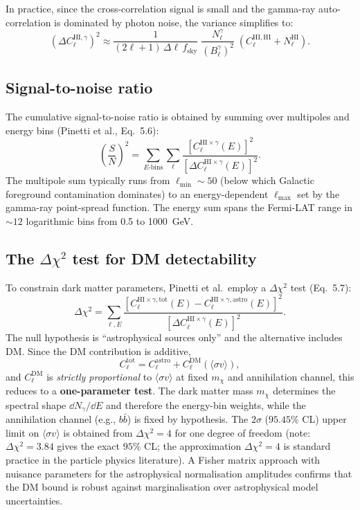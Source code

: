 \documentclass[10pt,a4paper]{article}
\newcommand{\Cl}{C_\ell}
\newcommand{\sigv}{\langle\sigma v\rangle}
\newcommand{\mchi}{m_\chi}
\newcommand{\fsky}{f_{\mathrm{sky}}}
\begin{document}
In practice, since the cross-correlation signal is small and the gamma-ray auto-correlation is dominated by photon noise, the variance simplifies to:
\begin{equation}
\label{eq:variance_approx}
\left(\Delta \Cl^{\mathrm{HI}, \gamma}\right)^2 \approx \frac{1}{(2\ell + 1) \, \Delta\ell \, \fsky} \; \frac{N_\ell^\gamma}{(B_\ell^\gamma)^2} \; \left(\Cl^{\mathrm{HI, HI}} + N_\ell^{\mathrm{HI}}\right).
\end{equation}

\subsection{Signal-to-noise ratio}

The cumulative signal-to-noise ratio is obtained by summing over multipoles and energy bins (Pinetti et al., Eq.~5.6):
\begin{equation}
\label{eq:SN}
\left(\frac{S}{N}\right)^2 = \sum_{E\text{-bins}} \sum_\ell \frac{\left[\Cl^{\mathrm{HI} \times \gamma}(E)\right]^2}{\left[\Delta \Cl^{\mathrm{HI} \times \gamma}(E)\right]^2}.
\end{equation}
The multipole sum typically runs from $\ell_{\mathrm{min}} \sim 50$ (below which Galactic foreground contamination dominates) to an energy-dependent $\ell_{\mathrm{max}}$ set by the gamma-ray point-spread function. The energy sum spans the Fermi-LAT range in $\sim 12$ logarithmic bins from 0.5 to 1000~GeV.

\subsection{The $\Delta\chi^2$ test for DM detectability}

To constrain dark matter parameters, Pinetti et al.\ employ a $\Delta\chi^2$ test (Eq.~5.7):
\begin{equation}
\label{eq:chi2}
\Delta\chi^2 = \sum_{\ell, E} \frac{\left[\Cl^{\mathrm{HI} \times \gamma, \mathrm{tot}}(E) - \Cl^{\mathrm{HI} \times \gamma, \mathrm{astro}}(E)\right]^2}{\left[\Delta \Cl^{\mathrm{HI} \times \gamma}(E)\right]^2}.
\end{equation}
The null hypothesis is ``astrophysical sources only'' and the alternative includes DM. Since the DM contribution is additive,
\begin{equation}
\Cl^{\mathrm{tot}} = \Cl^{\mathrm{astro}} + \Cl^{\mathrm{DM}}(\sigv),
\end{equation}
and $\Cl^{\mathrm{DM}}$ is \textit{strictly proportional} to $\sigv$ at fixed $\mchi$ and annihilation channel, this reduces to a \textbf{one-parameter test}. The dark matter mass $\mchi$ determines the spectral shape $\dd N_\gamma/\dd E$ and therefore the energy-bin weights, while the annihilation channel (e.g., $b\bar{b}$) is fixed by hypothesis. The $2\sigma$ ($95.45\%$ CL) upper limit on $\sigv$ is obtained from $\Delta\chi^2 = 4$ for one degree of freedom (note: $\Delta\chi^2 = 3.84$ gives the exact $95\%$ CL; the approximation $\Delta\chi^2 = 4$ is standard practice in the particle physics literature). A Fisher matrix approach with nuisance parameters for the astrophysical normalisation amplitudes confirms that the DM bound is robust against marginalisation over astrophysical model uncertainties.
\end{document}
